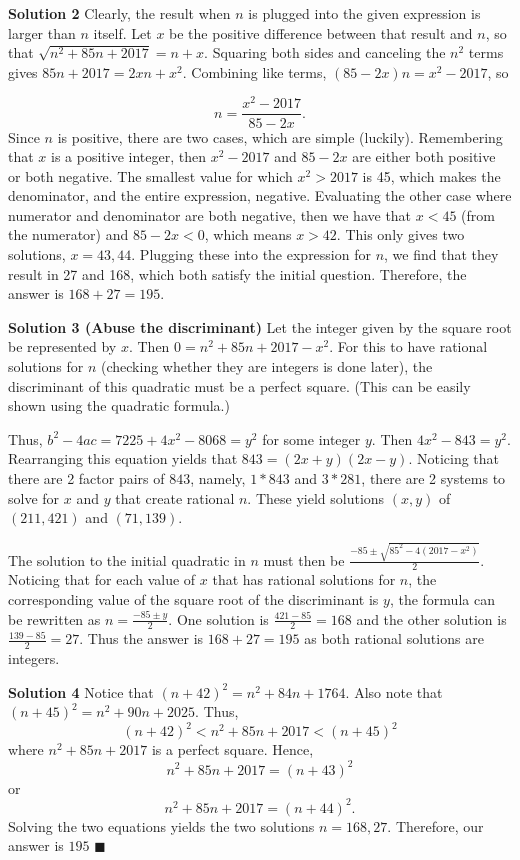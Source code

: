 \documentclass[a4paper,11pt]{article}
\begin{document}
\textbf{Solution 2}
Clearly, the result when $n$ is plugged into the given expression is larger than $n$ itself. Let $x$ be the positive difference between that result and $n$, so that $\sqrt{n^2+85n+2017}=n+x$. Squaring both sides and canceling the $n^2$ terms gives $85n+2017=2xn+x^2$. Combining like terms, $(85-2x)n=x^2-2017$, so

\[n=\frac{x^2-2017}{85-2x}.\]
Since $n$ is positive, there are two cases, which are simple (luckily). Remembering that $x$ is a positive integer, then $x^2-2017$ and $85-2x$ are either both positive or both negative. The smallest value for which $x^2>2017$ is 45, which makes the denominator, and the entire expression, negative. Evaluating the other case where numerator and denominator are both negative, then we have that $x<45$ (from the numerator) and  $85-2x<0$, which means $x>42$. This only gives two solutions, $x=43, 44$. Plugging these into the expression for $n$, we find that they result in 27 and 168, which both satisfy the initial question. Therefore, the answer is $168+27=\boxed{195}$.

\textbf{Solution 3 (Abuse the discriminant)}
Let the integer given by the square root be represented by $x$. Then $0 = n^2 + 85n + 2017 - x^2$. For this to have rational solutions for $n$ (checking whether they are integers is done later), the discriminant of this quadratic must be a perfect square. (This can be easily shown using the quadratic formula.)

Thus, $b^2 - 4ac = 7225 + 4x^2 - 8068 = y^2$ for some integer $y$. Then $4x^2 - 843 = y^2$. Rearranging this equation yields that $843 = (2x+y)(2x-y)$. Noticing that there are 2 factor pairs of $843$, namely, $1*843$ and $3*281$, there are 2 systems to solve for $x$ and $y$ that create rational $n$. These yield solutions $(x,y)$ of $(211, 421)$ and $(71, 139)$.

The solution to the initial quadratic in $n$ must then be $\frac{-85 \pm \sqrt{85^2 - 4(2017 - x^2)}}{2}$. Noticing that for each value of $x$ that has rational solutions for $n$, the corresponding value of the square root of the discriminant is $y$, the formula can be rewritten as $n = \frac{-85 \pm y}{2}$. One solution is $\frac{421 - 85}{2} = 168$ and the other solution is $\frac{139 - 85}{2} = 27$. Thus the answer is $168 + 27 = \boxed{195}$ as both rational solutions are integers.

\textbf{Solution 4}
Notice that $(n+42)^2= n^2+84n+1764$. Also note that $(n+45)^2= n^2+90n+2025$. Thus, \[(n+42)^2< n^2+85n+2017<(n+45)^2\] where $n^2+85n+2017$ is a perfect square. Hence,\[n^2+85n+2017= (n+43)^2\] or \[n^2+85n+2017= (n+44)^2.\] Solving the two equations yields the two solutions $n= 168, 27$. Therefore, our answer is $\boxed{195}$ \hfill $\blacksquare$
\end{document}
